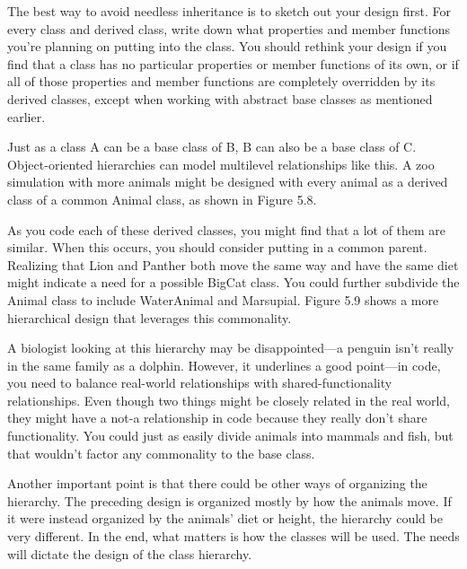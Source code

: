 
The best way to avoid needless inheritance is to sketch out your design first. For every class and derived class, write down what properties and member functions you’re planning on putting into the class. You should rethink your design if you find that a class has no particular properties or member functions of its own, or if all of those properties and member functions are completely overridden by its derived classes, except when working with abstract base classes as mentioned earlier.


Just as a class A can be a base class of B, B can also be a base class of C. Object-oriented hierarchies can model multilevel relationships like this. A zoo simulation with more animals might be designed with every animal as a derived class of a common Animal class, as shown in Figure 5.8.


As you code each of these derived classes, you might find that a lot of them are similar. When this occurs, you should consider putting in a common parent. Realizing that Lion and Panther both move the same way and have the same diet might indicate a need for a possible BigCat class. You could further subdivide the Animal class to include WaterAnimal and Marsupial. Figure 5.9 shows a more hierarchical design that leverages this commonality.


A biologist looking at this hierarchy may be disappointed—a penguin isn’t really in the same family as a dolphin. However, it underlines a good point—in code, you need to balance real-world relationships with shared-functionality relationships. Even though two things might be closely related in the real world, they might have a not-a relationship in code because they really don’t share functionality. You could just as easily divide animals into mammals and fish, but that wouldn’t factor any commonality to the base class.

Another important point is that there could be other ways of organizing the hierarchy. The preceding design is organized mostly by how the animals move. If it were instead organized by the animals’ diet or height, the hierarchy could be very different. In the end, what matters is how the classes will be used. The needs will dictate the design of the class hierarchy.

